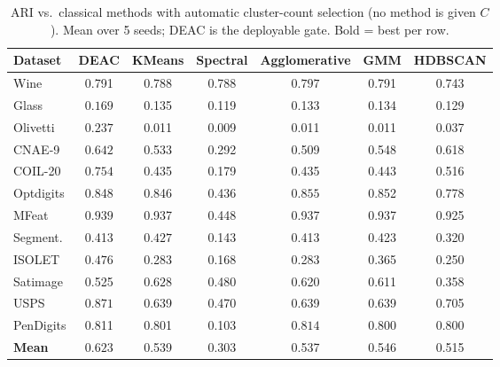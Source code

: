 \begin{table}[!t]
\centering
\caption{ARI vs.\ classical methods with automatic cluster-count selection (no method is given $C$). Mean over 5 seeds; DEAC is the deployable gate. Bold = best per row.}
\label{tab:benchmarks}
\footnotesize
\setlength{\tabcolsep}{3pt}
\begin{tabular}{lcccccc}
\toprule
Dataset & \textbf{DEAC} & KMeans & Spectral & Agglomerative & GMM & HDBSCAN \\
\midrule
Wine & 0.791 & 0.788 & 0.788 & $\mathbf{0.797}$ & 0.791 & 0.743 \\
Glass & $\mathbf{0.169}$ & 0.135 & 0.119 & 0.133 & 0.134 & 0.129 \\
Olivetti & $\mathbf{0.237}$ & 0.011 & 0.009 & 0.011 & 0.011 & 0.037 \\
CNAE-9 & $\mathbf{0.642}$ & 0.533 & 0.292 & 0.509 & 0.548 & 0.618 \\
COIL-20 & $\mathbf{0.754}$ & 0.435 & 0.179 & 0.435 & 0.443 & 0.516 \\
Optdigits & 0.848 & 0.846 & 0.436 & $\mathbf{0.855}$ & 0.852 & 0.778 \\
MFeat & $\mathbf{0.939}$ & 0.937 & 0.448 & 0.937 & 0.937 & 0.925 \\
Segment. & 0.413 & $\mathbf{0.427}$ & 0.143 & 0.413 & 0.423 & 0.320 \\
ISOLET & $\mathbf{0.476}$ & 0.283 & 0.168 & 0.283 & 0.365 & 0.250 \\
Satimage & 0.525 & $\mathbf{0.628}$ & 0.480 & 0.620 & 0.611 & 0.358 \\
USPS & $\mathbf{0.871}$ & 0.639 & 0.470 & 0.639 & 0.639 & 0.705 \\
PenDigits & 0.811 & 0.801 & 0.103 & $\mathbf{0.814}$ & 0.800 & 0.800 \\
\midrule
\textbf{Mean} & $\mathbf{0.623}$ & 0.539 & 0.303 & 0.537 & 0.546 & 0.515 \\
\bottomrule
\end{tabular}
\end{table}
